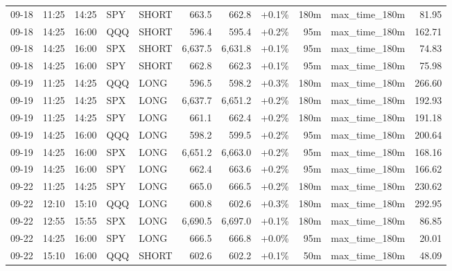 \documentclass[11pt,a4paper,twoside]{article}
\begin{document}
\begin{center}
\begin{longtable}{>{\color{txtmain}}l l l l l r r r r >{\color{txtmain}}l r}
09-18 & 11:25 & 14:25 & SPY & SHORT & 663.5 & 662.8 & \textcolor{wingreen}{+0.1\%} & 180m & max\_time\_180m & \textcolor{wingreen}{81.95} \\
09-18 & 14:25 & 16:00 & QQQ & SHORT & 596.4 & 595.4 & \textcolor{wingreen}{+0.2\%} & 95m & max\_time\_180m & \textcolor{wingreen}{162.71} \\
09-18 & 14:25 & 16:00 & SPX & SHORT & 6,637.5 & 6,631.8 & \textcolor{wingreen}{+0.1\%} & 95m & max\_time\_180m & \textcolor{wingreen}{74.83} \\
09-18 & 14:25 & 16:00 & SPY & SHORT & 662.8 & 662.3 & \textcolor{wingreen}{+0.1\%} & 95m & max\_time\_180m & \textcolor{wingreen}{75.98} \\
09-19 & 11:25 & 14:25 & QQQ & LONG & 596.5 & 598.2 & \textcolor{wingreen}{+0.3\%} & 180m & max\_time\_180m & \textcolor{wingreen}{266.60} \\
09-19 & 11:25 & 14:25 & SPX & LONG & 6,637.7 & 6,651.2 & \textcolor{wingreen}{+0.2\%} & 180m & max\_time\_180m & \textcolor{wingreen}{192.93} \\
09-19 & 11:25 & 14:25 & SPY & LONG & 661.1 & 662.4 & \textcolor{wingreen}{+0.2\%} & 180m & max\_time\_180m & \textcolor{wingreen}{191.18} \\
09-19 & 14:25 & 16:00 & QQQ & LONG & 598.2 & 599.5 & \textcolor{wingreen}{+0.2\%} & 95m & max\_time\_180m & \textcolor{wingreen}{200.64} \\
09-19 & 14:25 & 16:00 & SPX & LONG & 6,651.2 & 6,663.0 & \textcolor{wingreen}{+0.2\%} & 95m & max\_time\_180m & \textcolor{wingreen}{168.16} \\
09-19 & 14:25 & 16:00 & SPY & LONG & 662.4 & 663.6 & \textcolor{wingreen}{+0.2\%} & 95m & max\_time\_180m & \textcolor{wingreen}{166.62} \\
09-22 & 11:25 & 14:25 & SPY & LONG & 665.0 & 666.5 & \textcolor{wingreen}{+0.2\%} & 180m & max\_time\_180m & \textcolor{wingreen}{230.62} \\
09-22 & 12:10 & 15:10 & QQQ & LONG & 600.8 & 602.6 & \textcolor{wingreen}{+0.3\%} & 180m & max\_time\_180m & \textcolor{wingreen}{292.95} \\
09-22 & 12:55 & 15:55 & SPX & LONG & 6,690.5 & 6,697.0 & \textcolor{wingreen}{+0.1\%} & 180m & max\_time\_180m & \textcolor{wingreen}{86.85} \\
09-22 & 14:25 & 16:00 & SPY & LONG & 666.5 & 666.8 & \textcolor{wingreen}{+0.0\%} & 95m & max\_time\_180m & \textcolor{wingreen}{20.01} \\
09-22 & 15:10 & 16:00 & QQQ & SHORT & 602.6 & 602.2 & \textcolor{wingreen}{+0.1\%} & 50m & max\_time\_180m & \textcolor{wingreen}{48.09} \\

\end{longtable}
\end{center}
\end{document}
